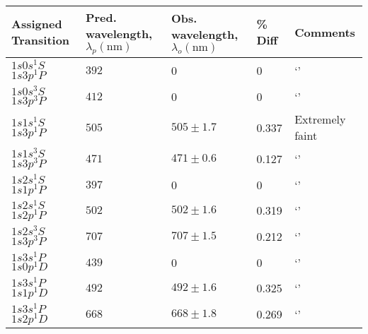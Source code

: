 \documentclass[10pt, twocolumn]{article}
\theoremstyle{definition}
\begin{document}
\begin{table}[ht!]
  \centering%
  \begin{tabular}{p{}p{}p{}p{}p{}}
    \toprule
    Assigned Transition         & Pred. wavelength, $\lambda_p (\unit{\nano\meter})$ & Obs. wavelength, $\lambda_o (\unit{\nano\meter})$ & \% Diff & Comments        \\
    \midrule
    $1s0s{}^1\!S$ $1s3p{}^1\!P$ & $392$                                              & 0                                                 & 0       & `'              \\
    \hline
    $1s0s{}^3\!S$ $1s3p{}^3\!P$ & $412$                                              & 0                                                 & 0       & `'              \\
    \hline
    $1s1s{}^1\!S$ $1s3p{}^1\!P$ & $505$                                              & $505\pm1.7$                                       & 0.337   & Extremely faint \\
    \hline
    $1s1s{}^3\!S$ $1s3p{}^3\!P$ & $471$                                              & $471\pm0.6$                                       & 0.127   & `'              \\
    \hline
    $1s2s{}^1\!S$ $1s1p{}^1\!P$ & $397$                                              & 0                                                 & 0       & `'              \\
    \hline
    $1s2s{}^1\!S$ $1s2p{}^1\!P$ & $502$                                              & $502\pm1.6$                                       & 0.319   & `'              \\
    \hline
    $1s2s{}^3\!S$ $1s3p{}^3\!P$ & $707$                                              & $707\pm1.5$                                       & 0.212   & `'              \\
    \hline
    $1s3s{}^1\!P$ $1s0p{}^1\!D$ & $439$                                              & 0                                                 & 0       & `'              \\
    \hline
    $1s3s{}^1\!P$ $1s1p{}^1\!D$ & $492$                                              & $492\pm1.6$                                       & 0.325   & `'              \\
    \hline
    $1s3s{}^1\!P$ $1s2p{}^1\!D$ & $668$                                              & $668\pm1.8$                                       & 0.269   & `'              \\

\end{tabular}
\end{table}
\end{document}
